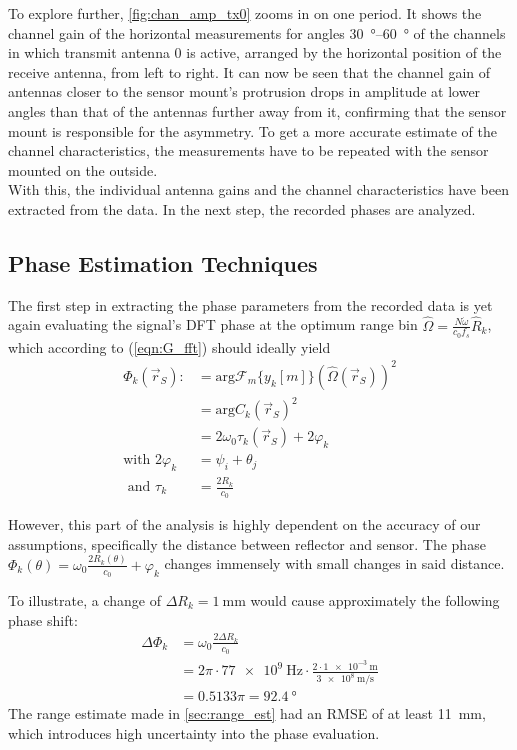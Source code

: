 To explore further, \autoref{fig:chan_amp_tx0} zooms in on one period.
It shows the channel gain of the horizontal measurements for angles \SIrange{30}{60}{\degree}
of the channels in which transmit antenna 0 is active, arranged by the horizontal position of the receive antenna, from left to right.
It can now be seen that the channel gain of antennas closer to the sensor mount's protrusion drops
in amplitude at lower angles than that of the antennas further away from it,
confirming that the sensor mount is responsible for the asymmetry.
To get a more accurate estimate of the channel characteristics,
the measurements have to be repeated with the sensor mounted on the outside.\\

With this, the individual antenna gains and the channel characteristics have been extracted from the data.
In the next step, the recorded phases are analyzed.

\subsection{Phase Estimation Techniques}
The first step in extracting the phase parameters from the recorded data is yet again
evaluating the signal's DFT phase at the optimum range bin $\hat \Omega = \frac{ N \dot \omega}{c_0 f_s}\hat R_k$,
which according to (\ref{eqn:G_fft}) should ideally yield
\begin{align}
    \Phi_k(\vec r_S) :     & = \text{arg} \mathcal{F}_m\{y_k[m]\} (\hat \Omega(\vec r_S))^2 \\
                           & =    \text{arg}C_k(\vec r_S)^2                                 \\
                           & = 2\omega_0\tau_k(\vec r_S) + 2\varphi_k                       \\
    \text{with } 2\varphi_k & = \psi_{i}+\theta_{j}                \\
    \text{ and } \tau_k    & = \frac{2R_k}{c_0}
\end{align}

However, this part of the analysis is highly dependent on the accuracy of our assumptions,
specifically the distance between reflector and sensor.
The phase $\Phi_k(\theta) = \omega_0 \frac{2R_k(\theta)}{c_0} + \varphi_k$ changes immensely with small changes in said distance.

To illustrate, a change of $\Delta R_k = \SI{1}{\mm}$ would cause approximately the following phase shift:
\begin{align*}
    \Delta\Phi_k & = \omega_0 \frac{2\Delta R_k}{c_0}                                            \\
                 & = 2\pi \cdot \SI{77e9}{\Hz} \cdot \frac{2\cdot\SI{1e-3}{\m}}{\SI{3e8}{\m/\s}} \\
                 & = 0.5133 \pi = \SI{92.4}{\degree}
\end{align*}
The range estimate made in \autoref{sec:range_est} had an RMSE of at least \SI{11}{\mm},
which introduces high uncertainty into the phase evaluation. \\

